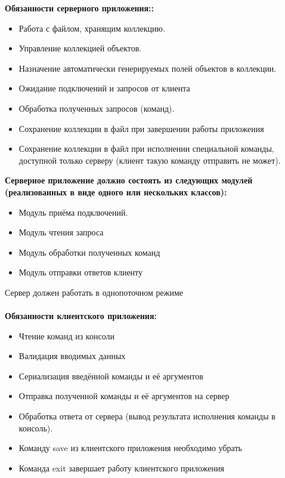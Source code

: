 \documentclass[14pt,final,oneside]{extreport}%
\begin{document}
    \textbf{Обязанности серверного приложения::}
    \begin{itemize}
        \item Работа с файлом, хранящим коллекцию.
        \item Управление коллекцией объектов.
        \item Назначение автоматически генерируемых полей объектов в коллекции.
        \item Ожидание подключений и запросов от клиента
        \item Обработка полученных запросов (команд).
        \item Сохранение коллекции в файл при завершении работы приложения
        \item Сохранение коллекции в файл при исполнении специальной команды, доступной только серверу (клиент такую команду отправить не может).
    \end{itemize}

    \textbf{Серверное приложение должно состоять из следующих модулей (реализованных в виде одного или нескольких классов):}
    \begin{itemize}
        \item Модуль приёма подключений.
        \item Модуль чтения запроса
        \item Модуль обработки полученных команд
        \item Модуль отправки ответов клиенту
    \end{itemize}

    Сервер должен работать в однопоточном режиме \\ \\

   \textbf{Обязанности клиентского приложения:}
   \begin{itemize}
        \item Чтение команд из консоли
        \item Валидация вводимых данных
        \item Сериализация введённой команды и её аргументов
        \item Отправка полученной команды и её аргументов на сервер
        \item Обработка ответа от сервера (вывод результата исполнения команды в консоль).
        \item Команду save из клиентского приложения необходимо убрать
        \item Команда exit завершает работу клиентского приложения
   \end{itemize}
\end{document}

